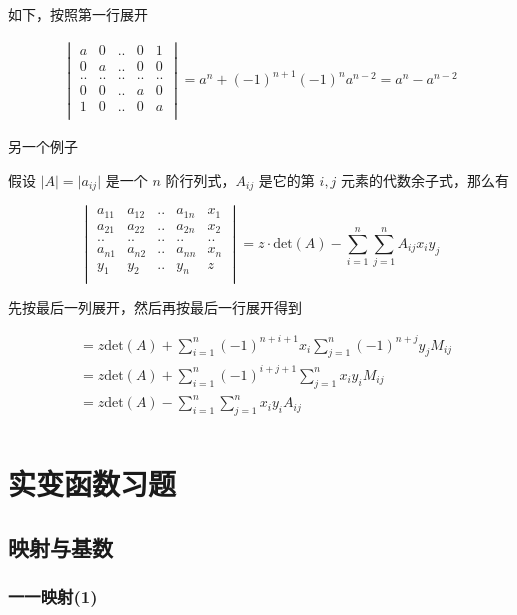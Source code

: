 \documentclass[12pt,a4paper]{ctexart}
\begin{document}
如下，按照第一行展开

\begin{align*}
    \begin{vmatrix}
        a & 0 & .. & 0 & 1 \\
        0 & a & .. & 0 & 0 \\
        .. & .. & .. & .. & .. \\
        0 & 0 & .. & a & 0 \\
        1 & 0 & .. & 0 & a \\
    \end{vmatrix} = a^n + (-1)^{n+1}(-1)^{n}a^{n-2} = a^n - a^{n-2}
\end{align*}

另一个例子

假设 $\lvert A \rvert = \lvert a_{ij}\rvert$ 是一个 $n$ 阶行列式，$A_{ij}$ 是它的第 $i,j$ 元素的代数余子式，那么有

\[
\begin{vmatrix}
    a_{11} & a_{12} & .. & a_{1n} & x_1 \\ 
    a_{21} & a_{22} & .. & a_{2n} & x_2 \\ 
    .. & .. &.. &.. &.. \\
    a_{n1} & a_{n2} & .. & a_{nn} & x_n \\ 
    y_1 & y_2 & .. & y_n & z \\ 
\end{vmatrix} = z \cdot \text{det} (A) - \sum_{i=1}^{n} \sum_{j=1}^{n}A_{ij}x_i y_j
\]

先按最后一列展开，然后再按最后一行展开得到

\begin{align*}
& = z \text{det}(A) + \sum_{i=1}^{n}(-1)^{n+i+1}x_i\sum_{j=1}^{n}(-1)^{n+j}y_jM_{ij} \\
& = z \text{det}(A) + \sum_{i=1}^{n}(-1)^{i+j+1}\sum_{j=1}^{n}x_iy_iM_{ij} \\
& = z \text{det}(A) - \sum_{i=1}^{n}\sum_{j=1}^{n}x_iy_iA_{ij} \\
\end{align*}

\section{实变函数习题}

\subsection{映射与基数}

\subsubsection{一一映射(1)}
\end{document}
